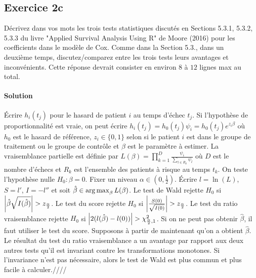 \documentclass[../main.tex]{subfiles}
\begin{document}
\begin{CJK*}{UTF8}{gbsn}
\section*{Exercice 2c}

Décrivez dans vos mots les trois tests statistiques discutés en Sections 5.3.1, 5.3.2,
5.3.3 du livre "Applied Survival Analysis Using R" de Moore (2016) pour les coefficients dans le modèle de Cox. 
Comme dans la Section 5.3., dans un deuxième temps, discutez/comparez entre les trois tests leurs avantages et
inconvénients. Cette réponse devrait consister en environ $8$ à $12$ lignes max au total.

\smallskip
\paragraph{Solution}

Écrire $h_i(t_j)$ pour le hasard de patient $i$ au temps d'échec $t_j$.
Si l'hypothèse de proportionnalité est vraie,
on peut écrire $h_i(t_j) = h_0(t_j) \psi_i = h_0(t_j) e^{z_i \beta}$
où $h_0$ est le hasard de référence, $z_i \in \{0, 1\}$ selon 
si le patient $i$ est dans le groupe de traitement ou le groupe de contrôle
et $\beta$ est le paramètre à estimer. 
La vraisemblance partielle est définie par 
$L(\beta) = \prod_{k=1}^D \frac{\psi_i}{\sum_{l \in R_k} \psi_l} $
où $D$ est le nombre d'échecs et $R_k$ est l'ensemble des patients à risque au temps $t_k$.
On teste l'hypothèse nulle $H_0 : \beta = 0$.
Fixer un niveau $\alpha \in (0, \frac{1}{2})$.
Écrire $l = \ln (L)$, $S = l'$, $I = - l''$ et soit $\hat{\beta} \in \operatorname*{arg\,max}_{\beta} L(\beta)$.
Le test de Wald rejette $H_0$ si $\abs{\hat{\beta} \sqrt{I(\hat{\beta})} } > z_{\frac{\alpha}{2}}$.
Le test du score rejette $H_0$ si $\abs{\frac{S(0)}{\sqrt{I(0)}}} > z_{\frac{\alpha}{2}}$.
Le test du ratio vraisemblance rejette $H_0$ si $\abs{2(l(\hat{\beta})-l(0))} > \chi^2_{\frac{\alpha}{2},1}$.
Si on ne peut pas obtenir $\hat{\beta}$, il faut utiliser le test du score.
Supposons à partir de maintenant qu'on a obtient $\hat{\beta}$.
Le résultat du test du ratio vraisemblance a un avantage par rapport aux deux autres tests
qu'il est invariant contre les transformations monotones.
Si l'invariance n'est pas nécessaire, alors le test de Wald est plus commun et plus facile à calculer.////

\end{CJK*}
\end{document}

